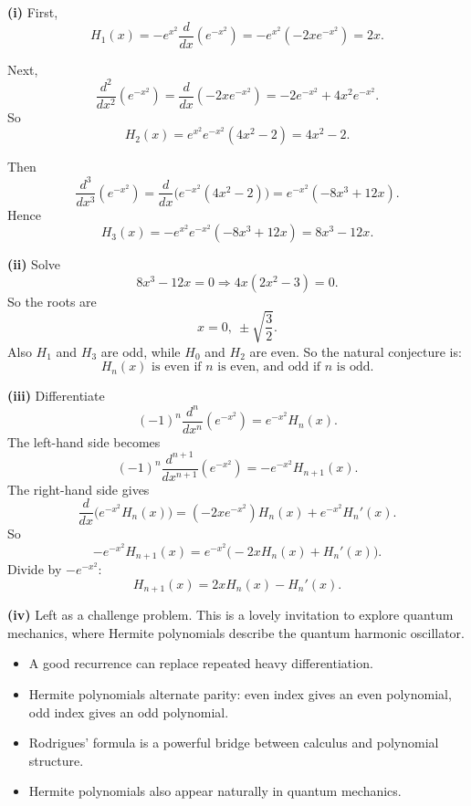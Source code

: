 \begin{solution}
\textbf{(i)} First,
\[
H_1(x)=-e^{x^2}\frac{d}{dx}(e^{-x^2})
=-e^{x^2}(-2xe^{-x^2})
=\boxed{2x}.
\]

Next,
\[
\frac{d^2}{dx^2}(e^{-x^2})
=\frac{d}{dx}(-2xe^{-x^2})
=-2e^{-x^2}+4x^2e^{-x^2}.
\]
So
\[
H_2(x)=e^{x^2}e^{-x^2}(4x^2-2)=\boxed{4x^2-2}.
\]

Then
\[
\frac{d^3}{dx^3}(e^{-x^2})
=\frac{d}{dx}\bigl(e^{-x^2}(4x^2-2)\bigr)
=e^{-x^2}(-8x^3+12x).
\]
Hence
\[
H_3(x)=-e^{x^2}e^{-x^2}(-8x^3+12x)=\boxed{8x^3-12x}.
\]

\textbf{(ii)} Solve
\[
8x^3-12x=0
\Rightarrow 4x(2x^2-3)=0.
\]
So the roots are
\[
\boxed{x=0,\ \pm\sqrt{\frac32}.}
\]
Also $H_1$ and $H_3$ are odd, while $H_0$ and $H_2$ are even. So the natural conjecture is:
\[
\boxed{H_n(x)\text{ is even if }n\text{ is even, and odd if }n\text{ is odd}.}
\]

\textbf{(iii)} Differentiate
\[
(-1)^n\frac{d^n}{dx^n}(e^{-x^2})=e^{-x^2}H_n(x).
\]
The left-hand side becomes
\[
(-1)^n\frac{d^{n+1}}{dx^{n+1}}(e^{-x^2})
=-e^{-x^2}H_{n+1}(x).
\]
The right-hand side gives
\[
\frac{d}{dx}\bigl(e^{-x^2}H_n(x)\bigr)
=(-2xe^{-x^2})H_n(x)+e^{-x^2}H_n'(x).
\]
So
\[
-e^{-x^2}H_{n+1}(x)=e^{-x^2}\bigl(-2xH_n(x)+H_n'(x)\bigr).
\]
Divide by $-e^{-x^2}$:
\[
\boxed{H_{n+1}(x)=2xH_n(x)-H_n'(x).}
\]

\textbf{(iv)} Left as a challenge problem. This is a lovely invitation to explore quantum mechanics, where Hermite polynomials describe the quantum harmonic oscillator.
\end{solution}

\begin{takeaways}
\begin{itemize}[leftmargin=*]
\item A good recurrence can replace repeated heavy differentiation.
\item Hermite polynomials alternate parity: even index gives an even polynomial, odd index gives an odd polynomial.
\item Rodrigues' formula is a powerful bridge between calculus and polynomial structure.
\item Hermite polynomials also appear naturally in quantum mechanics.
\end{itemize}
\end{takeaways}

